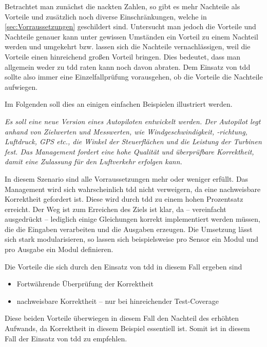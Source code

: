 \documentclass{mitschrift}
\begin{document}
Betrachtet man zunächst die nackten Zahlen, so gibt es mehr Nachteile als 
Vorteile und zusätzlich noch diverse Einschränkungen, welche in \autoref{sec:Vorraussetzungen}
geschildert sind. Untersucht man jedoch die Vorteile und Nachteile genauer
kann unter gewissen Umständen ein Vorteil zu einem Nachteil werden und
umgekehrt bzw. lassen sich die Nachteile vernachlässigen, weil die Vorteile
einen hinreichend großen Vorteil bringen. Dies bedeutet, dass man allgemein 
weder zu \gls{tdd} raten kann noch davon abraten. Dem Einsatz von \gls{tdd}
sollte also immer eine Einzelfallprüfung vorausgehen, ob die Vorteile die
Nachteile aufwiegen.

Im Folgenden soll dies an einigen einfachen Beispielen illustriert werden.

\begin{beispiel}
  \textit{Es soll eine neue Version eines Autopiloten entwickelt werden. Der Autopilot 
  legt anhand von Zielwerten und Messwerten, wie Windgeschwindigkeit, -richtung, Luftdruck,
  GPS etc., die Winkel der Steuerflächen und die Leistung der Turbinen fest. Das 
  Management fordert eine hohe Qualität und überprüfbare Korrektheit, damit eine 
  Zulassung für den Luftverkehr erfolgen kann.}
  
  In diesem Szenario sind alle Vorraussetzungen mehr oder weniger erfüllt. Das
  Management wird sich wahrscheinlich \gls{tdd} nicht verweigern, da eine
  nachweisbare Korrektheit gefordert ist. Diese wird durch \gls{tdd} zu einem
  hohen Prozentsatz erreicht. Der Weg ist zum Erreichen des Ziels ist klar, da
  -- vereinfacht ausgedrückt -- lediglich einige Gleichungen korrekt implementiert 
  werden müssen, die die Eingaben verarbeiten und die Ausgaben erzeugen. Die Umsetzung
  lässt sich stark modularisieren, so lassen sich beispielsweise pro Sensor ein Modul
  und pro Ausgabe ein Modul definieren.
  
  Die Vorteile die sich durch den Einsatz von \gls{tdd} in diesem Fall ergeben sind
  \begin{itemize}
    \item Fortwährende Überprüfung der Korrektheit
    \item nachweisbare Korrektheit -- nur bei hinreichender Test-Coverage
  \end{itemize}
  
  Diese beiden Vorteile überwiegen in diesem Fall den Nachteil des erhöhten Aufwands,
  da Korrektheit in diesem Beispiel essentiell ist. Somit ist in diesem Fall der
  Einsatz von \gls{tdd} zu empfehlen.
\end{beispiel}
\end{document}
